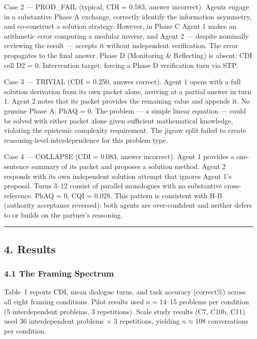 \documentclass[
  11pt,
]{article}
\begin{document}
Case 2 --- PROD\_FAIL (typical, CDI = 0.583, answer incorrect).
Agents engage in a substantive Phase A exchange, correctly identify the information asymmetry, and co-construct a solution strategy. However, in Phase C Agent 1 makes an arithmetic error computing a modular inverse, and Agent 2 --- despite nominally reviewing the result --- accepts it without independent verification. The error propagates to the final answer. Phase D (Monitoring \& Reflecting) is absent: CDI cell D2 = 0. Intervention target: forcing a Phase D verification turn via STP.

Case 3 --- TRIVIAL (CDI = 0.250, answer correct).
Agent 1 opens with a full solution derivation from its own packet alone, arriving at a partial answer in turn 1. Agent 2 notes that its packet provides the remaining value and appends it. No genuine Phase A: PhAQ = 0. The problem --- a simple linear equation --- could be solved with either packet alone given sufficient mathematical knowledge, violating the epistemic complexity requirement. The jigsaw split failed to create reasoning-level interdependence for this problem type.

Case 4 --- COLLAPSE (CDI = 0.083, answer incorrect).
Agent 1 provides a one-sentence summary of its packet and proposes a solution method. Agent 2 responds with its own independent solution attempt that ignores Agent 1's proposal. Turns 3--12 consist of parallel monologues with no substantive cross-reference. PhAQ = 0, CQI = 0.028. This pattern is consistent with H-B (authority acceptance reversed): both agents are over-confident and neither defers to or builds on the partner's reasoning.

\begin{center}\rule{0.5\linewidth}{0.5pt}\end{center}

\subsection{4. Results}\label{results}

\subsubsection{4.1 The Framing Spectrum}\label{the-framing-spectrum}

Table~1 reports CDI, mean dialogue turns, and task
accuracy (correct\%) across all eight framing conditions. Pilot results
used $n=14$--15 problems per condition (5 interdependent problems, 3
repetitions). Scale study results (C7, C10b, C11) used 36 interdependent
problems $\times$ 3 repetitions, yielding $n \approx 108$ conversations
per condition.
\end{document}
